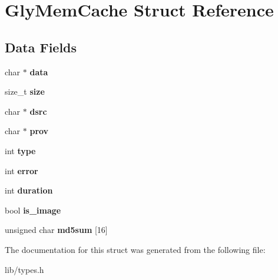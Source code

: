 \hypertarget{structGlyMemCache}{
\section{GlyMemCache Struct Reference}
\label{structGlyMemCache}
}
\subsection*{Data Fields}
\begin{DoxyCompactItemize}
\item 
\hypertarget{structGlyMemCache_aeab256f3b8668bd75272bee8c742d61c}{
char $\ast$ {\bfseries data}}
\label{structGlyMemCache_aeab256f3b8668bd75272bee8c742d61c}

\item 
\hypertarget{structGlyMemCache_a77c861a56691068dccf3a2d82b918a9c}{
size\_\-t {\bfseries size}}
\label{structGlyMemCache_a77c861a56691068dccf3a2d82b918a9c}

\item 
\hypertarget{structGlyMemCache_ad153c8a874b34646cea18853ad9abeb2}{
char $\ast$ {\bfseries dsrc}}
\label{structGlyMemCache_ad153c8a874b34646cea18853ad9abeb2}

\item 
\hypertarget{structGlyMemCache_a092896d691b58428158c7c8feeb56cd3}{
char $\ast$ {\bfseries prov}}
\label{structGlyMemCache_a092896d691b58428158c7c8feeb56cd3}

\item 
\hypertarget{structGlyMemCache_a82907302bf22f7eb833c513015bfed8c}{
int {\bfseries type}}
\label{structGlyMemCache_a82907302bf22f7eb833c513015bfed8c}

\item 
\hypertarget{structGlyMemCache_a0237d8367f49eab5daea346a85ba64a1}{
int {\bfseries error}}
\label{structGlyMemCache_a0237d8367f49eab5daea346a85ba64a1}

\item 
\hypertarget{structGlyMemCache_a47052fbf969756343111515ebf5ffba2}{
int {\bfseries duration}}
\label{structGlyMemCache_a47052fbf969756343111515ebf5ffba2}

\item 
\hypertarget{structGlyMemCache_a2cafa98f895ff66ef4d1808a47590611}{
bool {\bfseries is\_\-image}}
\label{structGlyMemCache_a2cafa98f895ff66ef4d1808a47590611}

\item 
\hypertarget{structGlyMemCache_aff314f2f88da8449a40395fc96782826}{
unsigned char {\bfseries md5sum} \mbox{[}16\mbox{]}}
\label{structGlyMemCache_aff314f2f88da8449a40395fc96782826}

\end{DoxyCompactItemize}


The documentation for this struct was generated from the following file:\begin{DoxyCompactItemize}
\item 
lib/types.h\end{DoxyCompactItemize}
